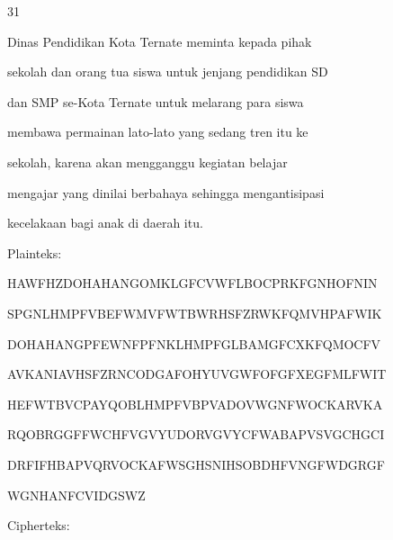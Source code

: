 \documentclass{article}
\begin{document}

31

Dinas Pendidikan Kota Ternate meminta kepada pihak 

sekolah dan orang tua siswa untuk jenjang pendidikan SD 

dan SMP se-Kota Ternate untuk melarang para siswa 

membawa permainan lato-lato yang sedang tren itu ke 

sekolah, karena akan mengganggu kegiatan belajar 

mengajar yang dinilai berbahaya sehingga mengantisipasi 

kecelakaan bagi anak di daerah itu.

Plainteks:

HAWFHZDOHAHANGOMKLGFCVWFLBOCPRKFGNHOFNIN

SPGNLHMPFVBEFWMVFWTBWRHSFZRWKFQMVHPAFWIK

DOHAHANGPFEWNFPFNKLHMPFGLBAMGFCXKFQMOCFV

AVKANIAVHSFZRNCODGAFOHYUVGWFOFGFXEGFMLFWIT

HEFWTBVCPAYQOBLHMPFVBPVADOVWGNFWOCKARVKA

RQOBRGGFFWCHFVGVYUDORVGVYCFWABAPVSVGCHGCI

DRFIFHBAPVQRVOCKAFWSGHSNIHSOBDHFVNGFWDGRGF

WGNHANFCVIDGSWZ

Cipherteks:
\end{document}

